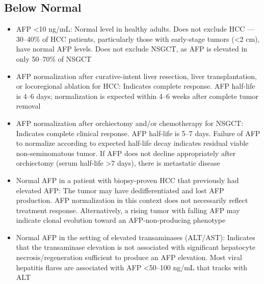 \subsection*{Below Normal}
\begin{itemize}
  \item AFP <10 ng/mL: Normal level in healthy adults. Does not exclude HCC --- 30--40\% of HCC patients, particularly those with early-stage tumors (<2 cm), have normal AFP levels. Does not exclude NSGCT, as AFP is elevated in only 50--70\% of NSGCT
  \item AFP normalization after curative-intent liver resection, liver transplantation, or locoregional ablation for HCC: Indicates complete response. AFP half-life is 4--6 days; normalization is expected within 4--6 weeks after complete tumor removal
  \item AFP normalization after orchiectomy and/or chemotherapy for NSGCT: Indicates complete clinical response. AFP half-life is 5--7 days. Failure of AFP to normalize according to expected half-life decay indicates residual viable non-seminomatous tumor. If AFP does not decline appropriately after orchiectomy (serum half-life >7 days), there is metastatic disease
  \item Normal AFP in a patient with biopsy-proven HCC that previously had elevated AFP: The tumor may have dedifferentiated and lost AFP production. AFP normalization in this context does not necessarily reflect treatment response. Alternatively, a rising tumor with falling AFP may indicate clonal evolution toward an AFP-non-producing phenotype
  \item Normal AFP in the setting of elevated transaminases (ALT/AST): Indicates that the transaminase elevation is not associated with significant hepatocyte necrosis/regeneration sufficient to produce an AFP elevation. Most viral hepatitis flares are associated with AFP <50--100 ng/mL that tracks with ALT
\end{itemize}

